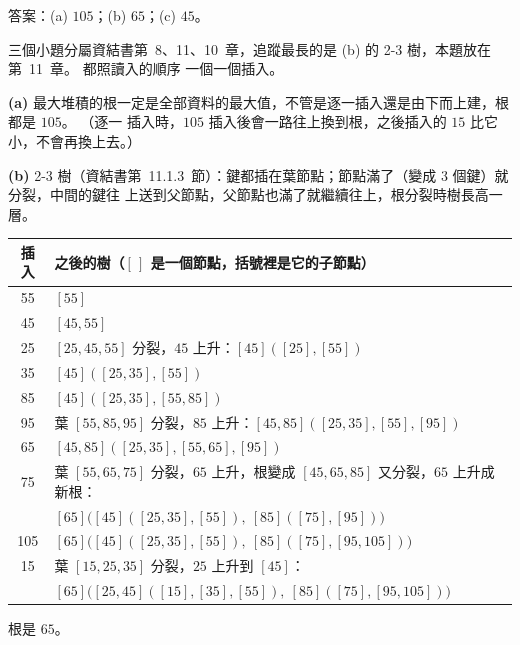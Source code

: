\begin{pastsoln}
答案：(a) $105$；(b) $65$；(c) $45$。

三個小題分屬資結書第~8、11、10~章，追蹤最長的是 (b) 的 2-3 樹，本題放在第~11~章。 都照讀入的順序
一個一個插入。

\textbf{(a)} 最大堆積的根一定是全部資料的最大值，不管是逐一插入還是由下而上建，根都是 $105$。 （逐一
插入時，$105$ 插入後會一路往上換到根，之後插入的 $15$ 比它小，不會再換上去。）

\textbf{(b)} 2-3 樹（資結書第~11.1.3~節）：鍵都插在葉節點；節點滿了（變成 $3$ 個鍵）就分裂，中間的鍵往
上送到父節點，父節點也滿了就繼續往上，根分裂時樹長高一層。
\begin{center}
\small
\begin{tabular}{cl}
\toprule
插入 & 之後的樹（$[\,]$ 是一個節點，括號裡是它的子節點） \\
\midrule
55 & $[55]$ \\
45 & $[45, 55]$ \\
25 & $[25, 45, 55]$ 分裂，$45$ 上升：$[45]([25], [55])$ \\
35 & $[45]([25, 35], [55])$ \\
85 & $[45]([25, 35], [55, 85])$ \\
95 & 葉 $[55, 85, 95]$ 分裂，$85$ 上升：$[45, 85]([25, 35], [55], [95])$ \\
65 & $[45, 85]([25, 35], [55, 65], [95])$ \\
75 & 葉 $[55, 65, 75]$ 分裂，$65$ 上升，根變成 $[45, 65, 85]$ 又分裂，$65$ 上升成新根： \\
 & \quad $[65]\bigl([45]([25, 35], [55]),\ [85]([75], [95])\bigr)$ \\
105 & $[65]\bigl([45]([25, 35], [55]),\ [85]([75], [95, 105])\bigr)$ \\
15 & 葉 $[15, 25, 35]$ 分裂，$25$ 上升到 $[45]$： \\
 & \quad $[65]\bigl([25, 45]([15], [35], [55]),\ [85]([75], [95, 105])\bigr)$ \\
\bottomrule
\end{tabular}
\end{center}
\begin{center}
\end{center}
根是 $65$。


\end{pastsoln}
